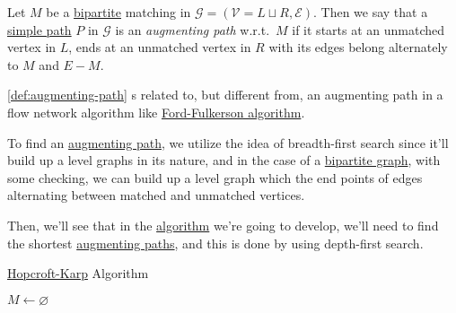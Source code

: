 \begin{definition}\label{def:augmenting-path}
	Let \(M\) be a \href{https://en.wikipedia.org/wiki/Bipartite_graph}{bipartite} matching in \(\mathcal{G} = (\mathcal{V} = L \sqcup R, \mathcal{E})\). Then we say that a \hyperref[def:simple-path]{simple path} \(P\) in \(\mathcal{G} \) is an \emph{augmenting path} w.r.t.\ \(M\) if it starts at an unmatched vertex in \(L\), ends at an unmatched vertex in \(R\) with its edges belong alternately to \(M\) and \(E - M\).
\end{definition}

\begin{note}
	\autoref{def:augmenting-path} s related to, but different from, an augmenting path in a flow network algorithm like \href{https://en.wikipedia.org/wiki/Ford%E2%80%93Fulkerson_algorithm}{Ford-Fulkerson algorithm}.
\end{note}

\begin{intuition}
	To find an \hyperref[def:augmenting-path]{augmenting path}, we utilize the idea of breadth-first search since it'll build up a level graphs in its nature, and in the case of a \href{https://en.wikipedia.org/wiki/Bipartite_graph}{bipartite graph}, with some checking, we can build up a level graph which the end points of edges alternating between matched and unmatched vertices.
\end{intuition}

Then, we'll see that in the \hyperref[algo:Hopcroft-Karp-algorithm]{algorithm} we're going to develop, we'll need to find the shortest \hyperref[def:augmenting-path]{augmenting paths}, and this is done by using depth-first search.

\begin{algorithm}[H]\label{algo:Hopcroft-Karp-algorithm}
	\DontPrintSemicolon
	\caption{\href{https://en.wikipedia.org/wiki/Hopcroft-Karp_algorithm}{Hopcroft-Karp} Algorithm}
	\BlankLine

	\(M\gets \varnothing \)
\end{algorithm}


